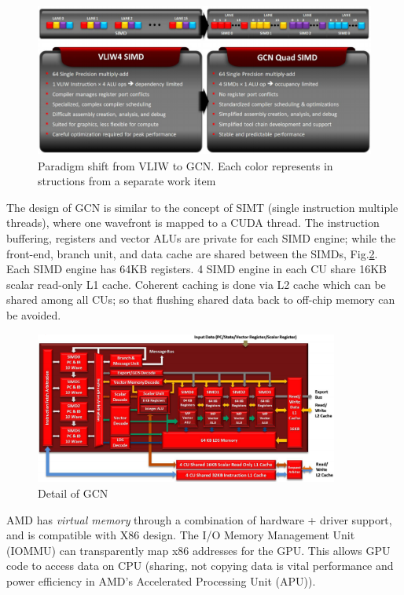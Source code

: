 \begin{figure}[hbt]
  \centerline{\includegraphics[height=5cm,
    angle=0]{./images/AMD_VLIWtoGCN.eps}}
\caption{Paradigm shift from VLIW to GCN. Each color represents in structions
from a separate work item}
\label{fig:GPU_VLIW-GCN}
\end{figure}

The design of GCN is similar to the concept of SIMT (single instruction multiple
threads), where one wavefront is mapped to a CUDA thread. The instruction
buffering, registers and vector ALUs are private for each SIMD engine; while the
front-end, branch unit, and data cache are shared between the SIMDs,
Fig.\ref{fig:GPU_AMD-GCN}. Each SIMD engine has 64KB registers.  4 SIMD engine in
each CU share 16KB scalar read-only L1 cache.  Coherent caching
is done via L2 cache which can be shared among all CUs; so that flushing shared
data back to off-chip memory can be avoided.

\begin{figure}[hbt]
  \centerline{\includegraphics[height=5cm,
    angle=0]{./images/AMD_GCNdetail.eps}}
\caption{Detail of GCN}
\label{fig:GPU_AMD-GCN}
\end{figure}

AMD has {\it virtual memory} through a combination of hardware + driver
support, and is compatible with X86 design. 
The I/O Memory Management Unit (IOMMU) can transparently map x86 addresses for
the GPU. This allows GPU code to access data on CPU (sharing, not copying data
is vital performance and power efficiency in AMD's Accelerated Processing Unit (APU)).


